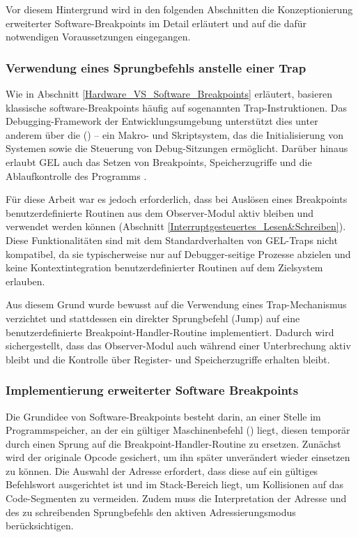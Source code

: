 Vor diesem Hintergrund wird in den folgenden Abschnitten die Konzeptionierung erweiterter Software-Breakpoints im Detail erl\"autert und auf die daf\"ur notwendigen Voraussetzungen eingegangen.


\newpage
\subsubsection{Verwendung eines Sprungbefehls anstelle einer Trap}
\label{sec:JumpVsTrap}

Wie in Abschnitt \ref{Hardware_VS_Software_Breakpoints} erl\"autert, basieren klassische software-Breakpoints h\"aufig auf sogenannten Trap-Instruktionen. Das Debugging-Framework der Entwicklungsumgebung unterst\"utzt dies unter anderem \"uber die  () – ein Makro- und Skriptsystem, das die Initialisierung von Systemen sowie die Steuerung von Debug-Sitzungen erm\"oglicht. Dar\"uber hinaus erlaubt GEL auch das Setzen von Breakpoints, Speicherzugriffe und die Ablaufkontrolle des Programms .

F\"ur diese Arbeit war es jedoch erforderlich, dass bei Ausl\"osen eines Breakpoints benutzerdefinierte Routinen aus dem Observer-Modul aktiv bleiben und verwendet werden k\"onnen (\Vgl Abschnitt \ref{Interruptgesteuertes_Lesen&Schreiben}). Diese Funktionalit\"aten sind mit dem Standardverhalten von GEL-Traps nicht kompatibel, da sie typischerweise nur auf Debugger-seitige Prozesse abzielen und keine Kontextintegration benutzerdefinierter Routinen auf dem Zielsystem erlauben.

Aus diesem Grund wurde bewusst auf die Verwendung eines Trap-Mechanismus verzichtet und stattdessen ein direkter Sprungbefehl (Jump) auf eine benutzerdefinierte Breakpoint-Handler-Routine implementiert. Dadurch wird sichergestellt, dass das Observer-Modul auch w\"ahrend einer Unterbrechung aktiv bleibt und die Kontrolle \"uber Register- und Speicherzugriffe erhalten bleibt.



\subsubsection{Implementierung erweiterter Software Breakpoints}
\label{sec:ImplementierungSoftwareBreakpoints}

Die Grundidee von Software-Breakpoints besteht darin, an einer Stelle im Programmspeicher, an der ein g\"ultiger Maschinenbefehl () liegt, diesen tempor\"ar durch einen Sprung auf die Breakpoint-Handler-Routine zu ersetzen. Zun\"achst wird der originale Opcode gesichert, um ihn sp\"ater unver\"andert wieder einsetzen zu k\"onnen. Die Auswahl der Adresse erfordert, dass diese auf ein g\"ultiges Befehlswort ausgerichtet ist und im Stack-Bereich liegt, um Kollisionen auf das Code-Segmenten zu vermeiden. Zudem muss die Interpretation der Adresse und des zu schreibenden Sprungbefehls den aktiven Adressierungsmodus ber\"ucksichtigen.

